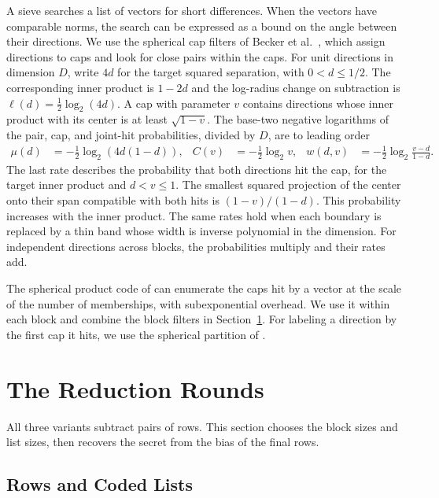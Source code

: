 \documentclass[runningheads,envcountsame,envcountsect,orivec]{llncs}
\begin{document}
A sieve searches a list of vectors for short differences.
When the vectors have comparable norms, the search can be
expressed as a bound on the angle between their directions.
We use the spherical cap filters of Becker et al.~\cite{BDGL16}, which assign directions to caps and look
for close pairs within the caps. For unit directions in
dimension $D$, write $4d$ for the target squared
separation, with $0<d\le1/2$. The corresponding inner product
is $1-2d$ and the log-radius change on subtraction is
$\ell(d)=\tfrac12\log_2(4d)$. A cap with parameter $v$ contains directions whose inner product
with its center is at least $\sqrt{1-v}$. The base-two negative logarithms
of the pair, cap, and joint-hit probabilities, divided by
$D$, are to leading order
\cite[Lemmas~2.1 and~2.2]{BDGL16}
\begin{align}
 \mu(d)&=-\tfrac12\log_2(4d(1-d)),&
 C(v)&=-\tfrac12\log_2 v,&
 w(d,v)&=-\tfrac12\log_2\frac{v-d}{1-d}.
 \label{eq:geometry}
\end{align}
The last rate describes the probability that both directions hit
the cap, for the target inner product and $d<v\le1$. The smallest squared
projection of the center onto their span compatible with
both hits is $(1-v)/(1-d)$. This probability increases with the inner product.
The same rates hold when each boundary is replaced by a
thin band whose width is inverse polynomial in the dimension. For independent directions across blocks, the
probabilities multiply and their rates add.

The spherical product code of
\cite[Definition~5.1, Lemma~5.1, and Theorem~5.1]{BDGL16}
can enumerate the caps hit by a vector at the scale of
the number of memberships, with subexponential overhead.
We use it within each block and combine the block filters
in Section~\ref{sec:framework}. For labeling a direction by
the first cap it hits, we use the spherical partition of
\cite[Section~3, Algorithm~1]{AINR14}.

\section{The Reduction Rounds}
\label{sec:framework}

All three variants subtract pairs of rows. This section chooses
the block sizes and list sizes, then recovers the secret from
the bias of the final rows.

\subsection{Rows and Coded Lists}
\end{document}
